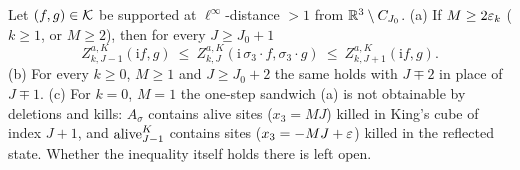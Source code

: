 \begin{lemma}\label{lem:s04:C}
Let $(f,g)\in\mathcal K$ be supported at $\ell^\infty$-distance $>1$ from $\mathbb R^3\setminus C_{J_0}$.
\textup{(a)} If $M\ge2\varepsilon_k$ (\ie $k\ge1$, or $M\ge2$), then for every $J\ge J_0+1$
\[
Z^{a,K}_{k,J-1}(\mathrm if,g)\ \le\ Z^{a,K}_{k,J}(\mathrm i\,\sigma_3\!\cdot\!f,\sigma_3\!\cdot\!g)\ \le\ Z^{a,K}_{k,J+1}(\mathrm if,g).
\]
\textup{(b)} For every $k\ge0$, $M\ge1$ and $J\ge J_0+2$ the same holds with $J\mp2$ in place of $J\mp1$.
\textup{(c)} For $k=0$, $M=1$ the one-step sandwich \textup{(a)} is not obtainable by deletions and kills: $A_\sigma$ contains alive sites ($x_3=MJ$) killed in King's cube of index $J+1$, and $\operatorname{alive}^K_{J-1}$ contains sites ($x_3=-MJ+\varepsilon$) killed in the reflected state. Whether the inequality itself holds there is left open.
\end{lemma}

